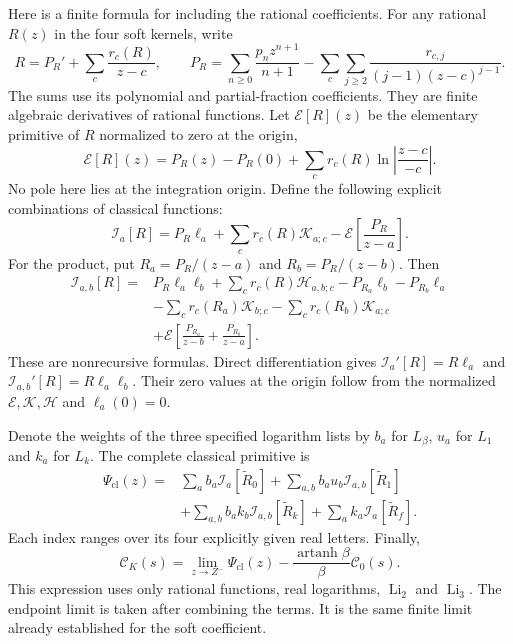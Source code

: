 Here is a finite formula for including the rational coefficients.
For any rational $R(z)$ in the four soft kernels, write
\begin{equation}
 R=P_R'+\sum_c\frac{r_c(R)}{z-c},\qquad
 P_R=\sum_{n\geq0}\frac{p_nz^{n+1}}{n+1}
 -\sum_c\sum_{j\geq2}\frac{r_{c,j}}{(j-1)(z-c)^{j-1}}.
\end{equation}
The sums use its polynomial and partial-fraction coefficients.
They are finite algebraic derivatives of rational functions.
Let $\mathcal E[R](z)$ be the elementary primitive of $R$ normalized
to zero at the origin,
\begin{equation}
 \mathcal E[R](z)=P_R(z)-P_R(0)
 +\sum_cr_c(R)\ln\left|\frac{z-c}{-c}\right|.
\end{equation}
No pole here lies at the integration origin.  Define the following
explicit combinations of classical functions:
\begin{equation}
 \mathcal I_a[R]
 =P_R\ell_a+\sum_cr_c(R)\mathcal K_{a;c}
 -\mathcal E\!\left[\frac{P_R}{z-a}\right].
 \label{eq:comp-ck-classical-single}
\end{equation}
For the product, put $R_a=P_R/(z-a)$ and $R_b=P_R/(z-b)$.  Then
\begin{equation}
 \begin{aligned}
 \mathcal I_{a,b}[R]={}&P_R\ell_a\ell_b
 +\sum_cr_c(R)\mathcal H_{a,b;c}
 -P_{R_a}\ell_b-P_{R_b}\ell_a\\
 &-\sum_cr_c(R_a)\mathcal K_{b;c}
  -\sum_cr_c(R_b)\mathcal K_{a;c}\\
 &+\mathcal E\!\left[\frac{P_{R_a}}{z-b}
                         +\frac{P_{R_b}}{z-a}\right].
 \end{aligned}
 \label{eq:comp-ck-classical-double}
\end{equation}
These are nonrecursive formulas.  Direct differentiation gives
$\mathcal I_a'[R]=R\ell_a$ and
$\mathcal I_{a,b}'[R]=R\ell_a\ell_b$.
Their zero values at the origin follow from the normalized
$\mathcal E,\mathcal K,\mathcal H$ and $\ell_a(0)=0$.

Denote the weights of the three specified logarithm lists by
$b_a$ for $L_\beta$, $u_a$ for $L_1$ and $k_a$ for $L_k$.
The complete classical primitive is
\begin{equation}
 \begin{aligned}
 \Psi_{\mathrm{cl}}(z)={}&
 \sum_ab_a\mathcal I_a[\widetilde R_0]
 +\sum_{a,b}b_au_b\mathcal I_{a,b}[\widetilde R_1]\\
 &+\sum_{a,b}b_ak_b\mathcal I_{a,b}[\widetilde R_k]
 +\sum_ak_a\mathcal I_a[\widetilde R_f].
 \end{aligned}
\end{equation}
Each index ranges over its four explicitly given real letters.
Finally,
\begin{equation}
 \boxed{\mathcal C_K(s)=\lim_{z\to Z^-}\Psi_{\mathrm{cl}}(z)
 -\frac{\operatorname{artanh}\beta}{\beta}\mathcal C_0(s).}
 \label{eq:comp-ck-classical-complete}
\end{equation}
This expression uses only rational functions, real logarithms,
$\operatorname{Li}_2$ and $\operatorname{Li}_3$.  The endpoint limit
is taken after combining the terms.  It is the same finite limit
already established for the soft coefficient.

